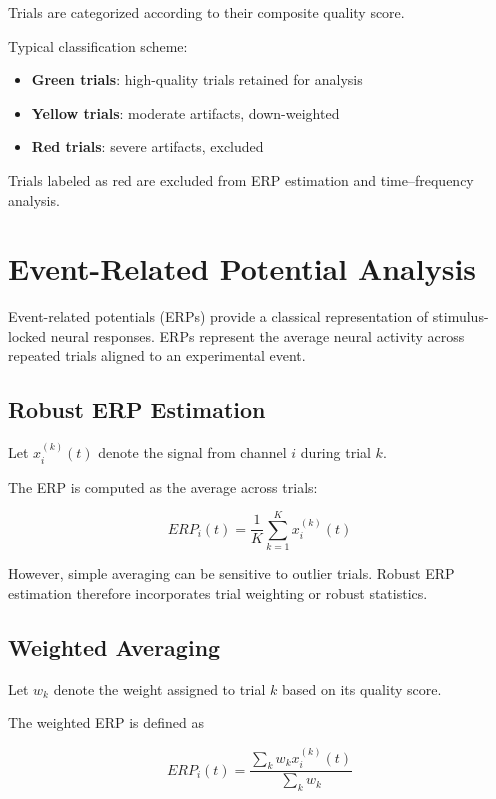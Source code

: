 \documentclass[11pt]{report}
\begin{document}
Trials are categorized according to their composite quality score.

Typical classification scheme:

\begin{itemize}
\item \textbf{Green trials}: high-quality trials retained for analysis
\item \textbf{Yellow trials}: moderate artifacts, down-weighted
\item \textbf{Red trials}: severe artifacts, excluded
\end{itemize}

Trials labeled as red are excluded from ERP estimation and
time--frequency analysis.

\chapter{Event-Related Potential Analysis}

Event-related potentials (ERPs) provide a classical representation
of stimulus-locked neural responses. ERPs represent the average
neural activity across repeated trials aligned to an experimental
event.

\section{Robust ERP Estimation}

Let $x_i^{(k)}(t)$ denote the signal from channel $i$ during trial $k$.

The ERP is computed as the average across trials:

\begin{equation}
ERP_i(t) =
\frac{1}{K}
\sum_{k=1}^{K}
x_i^{(k)}(t)
\end{equation}

However, simple averaging can be sensitive to outlier trials.
Robust ERP estimation therefore incorporates trial weighting
or robust statistics.

\section{Weighted Averaging}

Let $w_k$ denote the weight assigned to trial $k$ based on
its quality score.

The weighted ERP is defined as

\begin{equation}
ERP_i(t) =
\frac{
\sum_{k} w_k x_i^{(k)}(t)
}{
\sum_{k} w_k
}
\end{equation}
\end{document}
